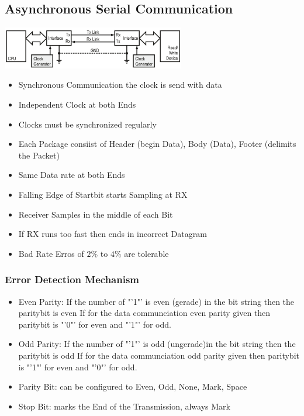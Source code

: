 \clearpage
\pagebreak
\subsection{Asynchronous Serial Communication }
\includegraphics[width=8cm]{images/asyn.png}
\begin{itemize}
	\item Synchronous Communication the clock is send with data
	\item Independent Clock at both Ends	
	\item Clocks must be synchronized regularly
	\item Each Package consiist of Header (begin Data), Body (Data), Footer (delimits the Packet)
	\item Same Data rate at both Ends
	\item Falling Edge of Startbit starts Sampling at RX
	\item Receiver Samples in the middle of each Bit
	\item If RX runs too fast then ends in incorrect Datagram
	\item Bad Rate Erros of $2\%$ to $4\%$ are tolerable
\end{itemize}
\subsubsection{Error Detection Mechanism}
\begin{itemize}
	\item Even Parity: If the number of "'1"' is even (gerade) in the bit string then the paritybit is even \newline If for the data communciation even parity given then paritybit is "'0"' for even and "'1"' for odd. 
	\item Odd Parity: If the number of "'1"' is odd (ungerade)in the bit string then the paritybit is odd \newline If for the data communciation odd parity given then paritybit is "'1"' for even and "'0"' for odd.
	\item Parity Bit: can be configured to Even, Odd, None, Mark, Space
	\item Stop Bit: marks the End of the Transmission, always Mark
\end{itemize}
